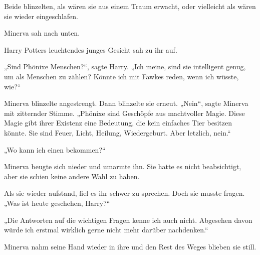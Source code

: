 Beide blinzelten, als wären sie aus einem Traum erwacht, oder vielleicht als wären sie wieder eingeschlafen. 

Minerva sah nach unten. 

Harry Potters leuchtendes junges Gesicht sah zu ihr auf. 

„Sind Phönixe Menschen?“, sagte Harry. „Ich meine, sind sie intelligent genug, um als Menschen zu zählen? Könnte ich mit Fawkes reden, wenn ich wüsste, wie?“ 

Minerva blinzelte angestrengt. Dann blinzelte sie erneut. „Nein“, sagte Minerva mit zitternder Stimme. „Phönixe sind Geschöpfe aus machtvoller Magie. Diese Magie gibt ihrer Existenz eine Bedeutung, die kein einfaches Tier besitzen könnte. Sie sind Feuer, Licht, Heilung, Wiedergeburt. Aber letzlich, nein.“ 

„Wo kann ich einen bekommen?“ 

Minerva beugte sich nieder und umarmte ihn. Sie hatte es nicht beabsichtigt, aber sie schien keine andere Wahl zu haben. 

Als sie wieder aufstand, fiel es ihr schwer zu sprechen. Doch sie musste fragen. „Was ist heute geschehen, Harry?“ 

„Die Antworten auf die wichtigen Fragen kenne ich auch nicht. Abgesehen davon würde ich erstmal wirklich gerne nicht mehr darüber nachdenken.“ 

Minerva nahm seine Hand wieder in ihre und den Rest des Weges blieben sie still. 


